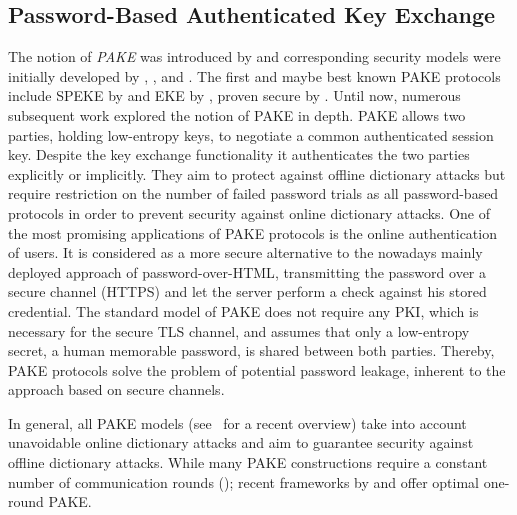 \subsection{Password-Based Authenticated Key Exchange}
The notion of \emph{\ac{PAKE}} was introduced by \citet{bellovin92} and corresponding security models were initially developed by \citet{Bellare2000}, \citet{Boyko2000}, and \citet{Goldreich01}.
The first and maybe best known \ac{PAKE} protocols include SPEKE by \citet{Jablon96} and EKE by \citet{bellovin92}, proven secure by \citet{Bellare2000}.
Until now, numerous subsequent work explored the notion of \ac{PAKE} in depth.
\ac{PAKE} allows two parties, holding low-entropy keys, to negotiate a common authenticated session key.
Despite the key exchange functionality it authenticates the two parties explicitly or implicitly.
They aim to protect against offline dictionary attacks but require restriction on the number of failed password trials as all password-based protocols in order to prevent security against online dictionary attacks.
One of the most promising applications of \ac{PAKE} protocols is the online authentication of users.
It is considered as a more secure alternative to the nowadays mainly deployed approach of password-over-\ac{HTML}, \ie transmitting the password over a secure channel (\ac{HTTPS}) and let the server perform a check against his stored credential.
The standard model of \ac{PAKE} does not require any \ac{PKI}, which is necessary for the secure \ac{TLS} channel, and assumes that only a low-entropy secret, \ie a human memorable password, is shared between both parties.
Thereby, \ac{PAKE} protocols solve the problem of potential password leakage, inherent to the approach based on secure channels.

In general, all \ac{PAKE} models (see~\citet{Pointcheval2012} for a recent overview) take into account unavoidable online dictionary attacks and aim to guarantee security against offline dictionary attacks.
While many \ac{PAKE} constructions require a constant number of communication rounds (\citet{KatzOY01,Gennaro2003,Abdalla2005,Gennaro2008,Katz2009a,Katz2011}); recent frameworks by \citet{Katz2011} and \citet{Benhamouda2013} offer optimal one-round \ac{PAKE}.

